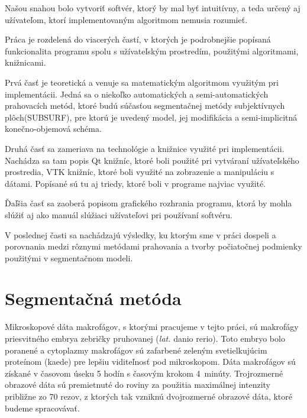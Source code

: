 \documentclass[a4paper,11pt,oneside]{article}%
\begin{document}
Našou snahou bolo vytvoriť softvér, ktorý by mal byť intuitívny, a teda určený aj užívateľom, ktorí implementovaným algoritmom nemusia rozumieť. 
  
Práca je rozdelená do viacerých častí, v ktorých je podrobnejšie popísaná funkcionalita programu spolu s užívateľským prostredím, použitými algoritmami, knižnicami.


Prvá časť je teoretická a venuje sa matematickým algoritmom využitým pri implementácii. Jedná sa o niekoľko automatických a semi-automatických prahovacích metód, ktoré budú súčasťou segmentačnej metódy subjektívnych plôch(SUBSURF), pre ktorú je uvedený model, jej modifikácia a semi-implicitná konečno-objemová schéma. 

Druhá časť sa zameriava na technológie a knižnice využité pri implementácii. Nachádza sa tam popis Qt knižníc, ktoré boli použité pri vytváraní užívateľského prostredia, VTK knižníc, ktoré boli využité na zobrazenie a manipuláciu s dátami. Popísané sú tu aj triedy, ktoré boli v programe najviac využité.

Ďaľšia časť sa zaoberá popisom grafického rozhrania programu, ktorá by mohla slúžiť aj ako manuál slúžiaci užívateľovi pri používaní softvéru.

V poslednej časti sa nachádzajú výsledky, ku ktorým sme v práci dospeli a porovnania medzi rôznymi metódami prahovania a tvorby počiatočnej podmienky použitými v segmentačnom modeli.


  

\newpage

\section{Segmentačná metóda} \label{math}

Mikroskopové dáta makrofágov, s ktorými pracujeme v tejto práci, sú makrofágy priesvitného embrya zebričky pruhovanej (\textit{lat.} danio rerio). Toto embryo bolo poranené a cytoplazmy makrofágov sú zafarbené zeleným svetielkujúcim proteínom (kaede) pre lepšiu viditeľnosť pod mikroskopom. Dáta makrofágov sú získané v časovom úseku 5 hodín  s časovým krokom 4~minúty.  Trojrozmerné obrazové dáta sú premietnuté do roviny za použitia maximálnej intenzity približne zo 70 rezov, z ktorých tak vzniknú dvojrozmerné obrazové dáta, ktoré budeme spracovávať. 
\end{document}
